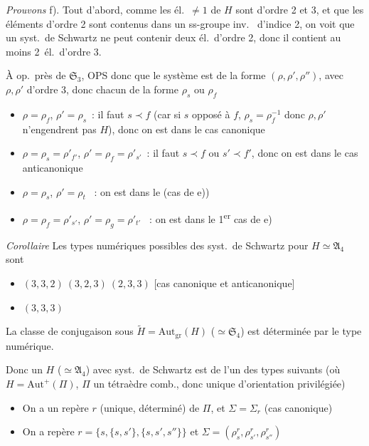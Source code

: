 \documentclass[11pt,a4paper]{article}
\begin{document}
\emph{Prouvons} f). Tout d'abord, comme les él.\ $\neq 1$ de $H$
sont d'ordre 2 et 3, et que les éléments d'ordre 2 sont contenus dans un
ss-groupe inv.\  d'indice 2, on voit que un syst.\ de
Schwartz ne peut contenir deux él.\ d'ordre 2, donc il contient au moins
2~él.\ d'ordre 3. 

À \struck{\ill{}} op.\ près de $\mathfrak{S}_3$, OPS donc que le
système est de la forme $(\rho, \rho', \rho'')$, avec $\rho, \rho'$ d'ordre
3, donc chacun de la forme $\rho_s$ ou $\rho_f$
\begin{itemize}
\item[1)] $\rho = \rho_f$, $\rho' = \rho_s$~: il faut $s \prec f$ (car si
$s$ opposé à $f$, $\rho_s = \rho_f^{-1}$ donc $\rho, \rho'$
n'engendrent pas $H$), donc on est dans le cas canonique
\item[2)] $\rho = \rho_s = \rho'_{f'}$, $\rho' = \rho_f = \rho'_{s'}$~: il
faut $s \prec f$ ou $s' \prec f'$, donc on est dans le cas anticanonique
\item[3)] $\rho = \rho_s$, $\rho' = \rho_t$ ~:
on est dans le  (cas de e))
\item[4)] $\rho = \rho_f = \rho'_{s'}$, $\rho' = \rho_g = \rho'_{t'}$
~: on est dans le 1\textsuperscript{er} cas
de e)
\end{itemize}

\emph{Corollaire} Les types numériques possibles des syst.\ de Schwartz pour
$H \simeq \mathfrak{A}_4$ sont
\begin{itemize}
\item[a)] $(3, 3, 2)\ (3, 2, 3)\ (2, 3, 3)$ [cas canonique et anticanonique]
\item[b)] $(3, 3, 3)$
\end{itemize}
 La classe de conjugaison sous
$\widetilde{H} = \mathrm{Aut}_{\mathrm{gr}}(H)$ ($\simeq \mathfrak{S}_4$) est
déterminée par le type numérique.

Donc un $H$ ($\simeq \mathfrak{A}_4$) avec syst.\ de Schwartz est de l'un des
types suivants (où $H = \mathrm{Aut}^{+}(\Pi)$, $\Pi$ un tétraèdre comb.,
donc \ill{} unique \ill{} d'orientation privilégiée)
\begin{itemize}
\item[a)] On a un repère $r$ (unique, déterminé) de $\Pi$, et
$\Sigma = \Sigma_r$ (cas canonique)
\item[b)] On a  \struck{\ill{}} repère
$r = \{s, \{s, s'\}, \{s, s', s''\}\}$  et
$\Sigma = (\rho_s^r, \rho_{s'}^r, \rho_{s''}^r)$ \ill{} \ill{}
\end{itemize}
\end{document}
